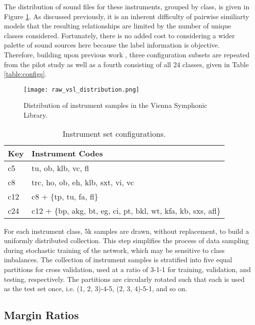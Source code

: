 The distribution of sound files for these instruments, grouped by class, is given in Figure \ref{fig:c24_dist}.
As discussed previously, it is an inherent difficulty of pairwise similiarty models that the resulting relationships are limited by the number of unique classes considered.
Fortunately, there is no added cost to considering a wider palette of sound sources here because the label information is objective.
Therefore, building upon previous work \cite{Humphrey2011}, three configuration subsets are repeated from the pilot study as well as a fourth consisting of all 24 classes, given in Table \ref{table:configs}.

\begin{figure}[h]
\centering
\texttt{[image: raw\_vsl\_distribution.png]}
\caption{Distribution of instrument samples in the Vienna Symphonic Library.}
\label{fig:c24_dist}
\end{figure}


\begin{table*}[h]
\begin{center}
\caption{Instrument set configurations.}
\begin{tabular}{l | l }
Key & Instrument Codes \\
\hline
c5 & tu, ob, klb, vc, fl \\
c8 & trc, ho, ob, eh, klb, sxt, vi, vc \\
c12 & c8 + \{tp, tu, fa, fl\} \\
c24 & c12 + \{bp, akg, bt, eg, ci, pt, bkl, wt, kfa, kb, sxs, afl\} \\
\hline
\end{tabular}
\label{tab:things}
\end{center}
\end{table*}

For each instrument class, 5k samples are drawn, without replacement, to build a uniformly distributed collection.
This step simplifies the process of data sampling during stochastic training of the network, which may be sensitive to class imbalances.
The collection of instrument samples is stratified into five equal partitions for cross validation, used at a ratio of 3-1-1 for training, validation, and testing, respectively.
The partitions are circularly rotated such that each is used as the test set once, i.e. (1, 2, 3)-4-5, (2, 3, 4)-5-1, and so on.


\subsection{Margin Ratios}

